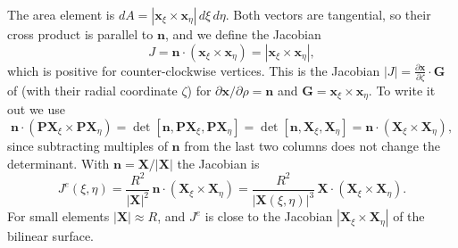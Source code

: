The area element is $dA = |\mathbf{x}_\xi\times\mathbf{x}_\eta|\,d\xi\,d\eta$. Both vectors are tangential, so their cross product is parallel to $\mathbf{n}$, and we define the Jacobian
\begin{equation}
    J = \mathbf{n}\cdot(\mathbf{x}_\xi\times\mathbf{x}_\eta) = |\mathbf{x}_\xi\times\mathbf{x}_\eta|,
\end{equation}
which is positive for counter-clockwise vertices. This is the Jacobian $|J| = \frac{\partial\mathbf{x}}{\partial\zeta}\cdot\mathbf{G}$ of \cite{GIRALDO2002499} (with their radial coordinate $\zeta$) for $\partial\mathbf{x}/\partial\rho = \mathbf{n}$ and $\mathbf{G} = \mathbf{x}_\xi\times\mathbf{x}_\eta$. To write it out we use
\begin{equation*}
    \mathbf{n}\cdot(\mathbf{P}\mathbf{X}_\xi\times\mathbf{P}\mathbf{X}_\eta) = \det[\mathbf{n},\mathbf{P}\mathbf{X}_\xi,\mathbf{P}\mathbf{X}_\eta] = \det[\mathbf{n},\mathbf{X}_\xi,\mathbf{X}_\eta] = \mathbf{n}\cdot(\mathbf{X}_\xi\times\mathbf{X}_\eta),
\end{equation*}
since subtracting multiples of $\mathbf{n}$ from the last two columns does not change the determinant. With $\mathbf{n} = \mathbf{X}/|\mathbf{X}|$ the Jacobian is
\begin{equation}\label{eq:dg-jacobian}
    J^e(\xi,\eta) = \frac{R^2}{|\mathbf{X}|^2}\,\mathbf{n}\cdot(\mathbf{X}_\xi\times\mathbf{X}_\eta) = \frac{R^2}{|\mathbf{X}(\xi,\eta)|^3}\,\mathbf{X}\cdot(\mathbf{X}_\xi\times\mathbf{X}_\eta).
\end{equation}
For small elements $|\mathbf{X}|\approx R$, and $J^e$ is close to the Jacobian $|\mathbf{X}_\xi\times\mathbf{X}_\eta|$ of the bilinear surface.

